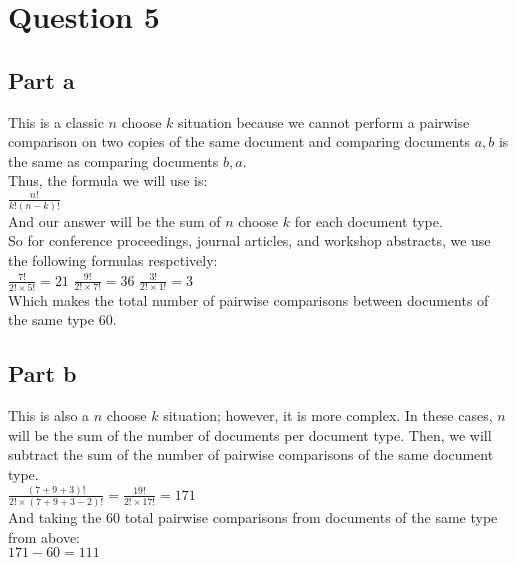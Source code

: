 \documentclass[11pt]{article}
\begin{document}
\section*{Question 5}

\subsection*{Part a}
\noindent
This is a classic $ n $ choose $ k $ situation because we cannot perform a pairwise comparison on two copies of the same document and comparing documents $ {a,b} $ is the same as comparing documents $ {b,a} $.\\
Thus, the formula we will use is:\\
$ \frac{n!}{k!(n-k)!} $\\
And our answer will be the sum of $ n $ choose $ k $ for each document type.\\
So for conference proceedings, journal articles, and workshop abstracts, we use the following formulas respctively:\\
$ \frac{7!}{2! \times 5!} = 21 $ $ \frac{9!}{2!\times 7!} = 36 $ $ \frac{3!}{2! \times 1!} = 3 $\\
Which makes the total number of pairwise comparisons between documents of the same type 60.

\subsection*{Part b}
This is also a $ n $ choose $ k $ situation; however, it is more complex. In these cases, $ n $ will be the sum of the number of documents per document type. Then, we will subtract the sum of the number of pairwise comparisons of the same document type.\\
$ \frac{(7 + 9 + 3)!}{2! \times (7 + 9 + 3 - 2)!} = \frac{19!}{2! \times 17!} = 171 $\\
And taking the 60 total pairwise comparisons from documents of the same type from above:\\
$ 171 - 60 = 111 $
\end{document}

